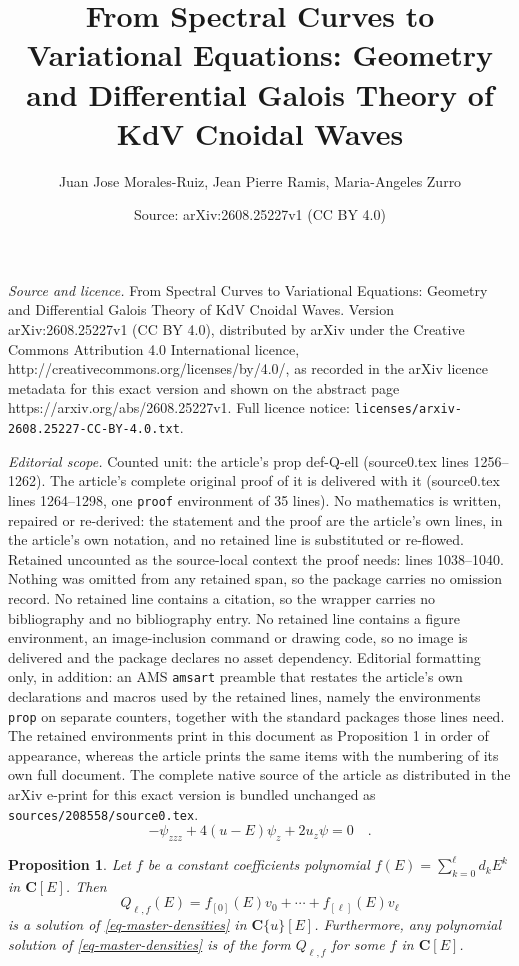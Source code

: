 \documentclass[10pt,a4paper]{amsart}
\title{From Spectral Curves to Variational Equations: Geometry and Differential Galois Theory of KdV Cnoidal Waves}
\author{Juan Jose Morales-Ruiz, Jean Pierre Ramis, Maria-Angeles Zurro}
\date{Source: arXiv:2608.25227v1 (CC BY 4.0)}
\newtheorem{prop}{Proposition}
\newcommand{\coC}{\mathbf{C}}
\begin{document}
\maketitle

\noindent\emph{Source and licence.} From Spectral Curves to Variational Equations: Geometry and Differential Galois Theory of KdV Cnoidal Waves. Version arXiv:2608.25227v1 (CC BY 4.0), distributed by arXiv under the Creative Commons Attribution 4.0 International licence, http://creativecommons.org/licenses/by/4.0/, as recorded in the arXiv licence metadata for this exact version and shown on the abstract page https://arxiv.org/abs/2608.25227v1. Full licence notice: \texttt{licenses/arxiv-2608.25227-CC-BY-4.0.txt}.\par\smallskip

\noindent\textit{Editorial scope.} Counted unit: the article's prop def-Q-ell (source0.tex lines 1256--1262). The article's complete original proof of it is delivered with it (source0.tex lines 1264--1298, one \texttt{proof} environment of 35 lines). No mathematics is written, repaired or re-derived: the statement and the proof are the article's own lines, in the article's own notation, and no retained line is substituted or re-flowed.  Retained uncounted as the source-local context the proof needs: lines 1038--1040.  Nothing was omitted from any retained span, so the package carries no omission record.  No retained line contains a citation, so the wrapper carries no bibliography and no bibliography entry.  No retained line contains a figure environment, an image-inclusion command or drawing code, so no image is delivered and the package declares no asset dependency.  Editorial formatting only, in addition: an AMS \texttt{amsart} preamble that restates the article's own declarations and macros used by the retained lines, namely the environments \texttt{prop} on separate counters, together with the standard packages those lines need.  The retained environments print in this document as Proposition 1 in order of appearance, whereas the article prints the same items with the numbering of its own full document.  The complete native source of the article as distributed in the arXiv e-print for this exact version is bundled unchanged as \texttt{sources/208558/source0.tex}.
 \begin{equation}\label{eq-master-densities}
-\psi_{zzz}+4 (u-E)\psi_z +2u_z \psi  =0 \quad .
\end{equation}

\begin{prop}
    Let $f$ be  a constant coefficients polynomial $f(E)=\sum_{k=0}^\ell d_k E^k $ in $\coC[E]$. Then
    \begin{equation}\label{def-Q-ell}
        Q_{\ell , f } (E) = f_{[0]}(E) v_0 +\cdots + f_{[\ell]}(E) v_\ell
    \end{equation}
    is a solution of \eqref{eq-master-densities} in $\coC\{u\}[E]$. Furthermore, any polynomial solution of \eqref{eq-master-densities} is of the form $Q_{\ell , f } $ for some $f  $ in $\coC[E]$.
\end{prop}
\end{document}
